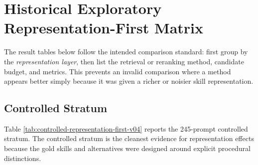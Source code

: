 \section{Historical Exploratory Representation-First Matrix}

The result tables below follow the intended comparison standard: first group by the \emph{representation layer}, then list the retrieval or reranking method, candidate budget, and metrics. This prevents an invalid comparison where a method appears better simply because it was given a richer or noisier skill representation.

\subsection{Controlled Stratum}

Table \ref{tab:controlled-representation-first-v04} reports the 245-prompt controlled stratum. The controlled stratum is the cleanest evidence for representation effects because the gold skills and alternatives were designed around explicit procedural distinctions.

